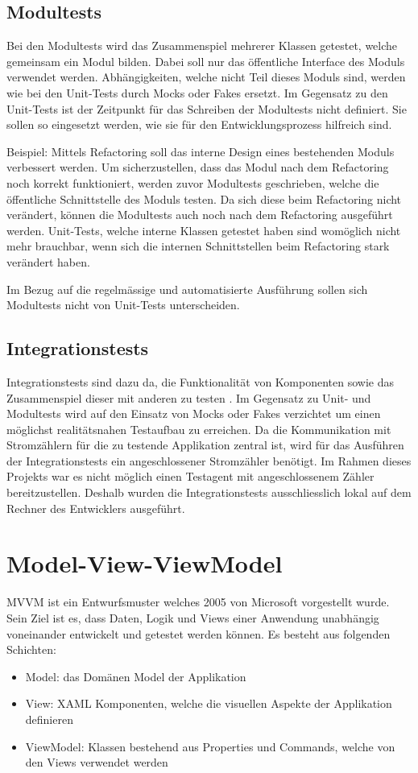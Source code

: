 \subsection{Modultests}
Bei den Modultests wird das Zusammenspiel mehrerer Klassen getestet, welche gemeinsam ein Modul bilden.
Dabei soll nur das öffentliche Interface des Moduls verwendet werden.
Abhängigkeiten, welche nicht Teil dieses Moduls sind, werden wie bei den Unit-Tests durch Mocks oder Fakes ersetzt.
Im Gegensatz zu den Unit-Tests ist der Zeitpunkt für das Schreiben der Modultests nicht definiert.
Sie sollen so eingesetzt werden, wie sie für den Entwicklungsprozess hilfreich sind.

Beispiel: Mittels Refactoring soll das interne Design eines bestehenden Moduls verbessert werden.
Um sicherzustellen, dass das Modul nach dem Refactoring noch korrekt funktioniert, werden zuvor Modultests geschrieben, welche die öffentliche Schnittstelle des Moduls testen.
Da sich diese beim Refactoring nicht verändert, können die Modultests auch noch nach dem Refactoring ausgeführt werden.
Unit-Tests, welche interne Klassen getestet haben sind womöglich nicht mehr brauchbar, wenn sich die internen Schnittstellen beim Refactoring stark verändert haben.

Im Bezug auf die regelmässige und automatisierte Ausführung sollen sich Modultests nicht von Unit-Tests unterscheiden.


\subsection{Integrationstests}\label{Integrationstests}
Integrationstests sind dazu da, die Funktionalität von Komponenten sowie das Zusammenspiel dieser mit anderen zu testen \parencite{winter2012integrationstest}.
Im Gegensatz zu Unit- und Modultests wird auf den Einsatz von Mocks oder Fakes verzichtet um einen möglichst realitätsnahen Testaufbau zu erreichen.
Da die Kommunikation mit Stromzählern für die zu testende Applikation zentral ist, wird für das Ausführen der Integrationstests ein angeschlossener Stromzähler benötigt.
Im Rahmen dieses Projekts war es nicht möglich einen Testagent mit angeschlossenem Zähler bereitzustellen.
Deshalb wurden die Integrationstests ausschliesslich lokal auf dem Rechner des Entwicklers ausgeführt.


\section{Model-View-ViewModel}\label{mvvm}
\ac{MVVM} ist ein Entwurfsmuster welches 2005 von Microsoft vorgestellt wurde.
Sein Ziel ist es, dass Daten, Logik und Views einer Anwendung unabhängig voneinander entwickelt und getestet werden können.
Es besteht aus folgenden Schichten:
\begin{itemize}
   \item Model: das Domänen Model der Applikation
   \item View: XAML Komponenten, welche die visuellen Aspekte der Applikation definieren
   \item ViewModel: Klassen bestehend aus Properties und Commands, welche von den Views verwendet werden
\end{itemize}

